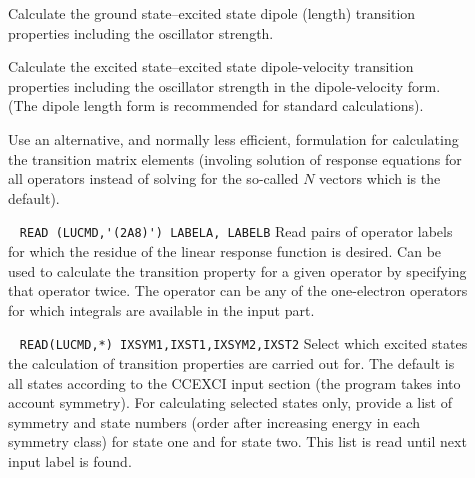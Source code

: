 \begin{description}

\item[]
%
Calculate the ground state--excited state dipole (length) transition properties including
the oscillator strength.
%
\item[]
%
Calculate the excited state--excited state dipole-velocity  transition properties including
the oscillator strength in the dipole-velocity form. (The dipole length form is recommended
for standard calculations).
%
\item[]
%
Use an alternative, and normally less efficient, formulation for calculating
the transition matrix elements (involing solution of response equations for
all operators instead of solving for the so-called $N$ vectors which is the default).
%
\item[]\verb| |  \newline
\verb|READ (LUCMD,'(2A8)') LABELA, LABELB|\newline
%
Read pairs of operator labels for which the residue of the linear response
function is desired.
Can be used to calculate the transition property for a given operator
by specifying that operator twice. The operator can be any of the one-electron
operators for which integrals are available in the  input part.
%
\item[] \verb| | \newline
\verb|READ(LUCMD,*) IXSYM1,IXST1,IXSYM2,IXST2|\newline 
%
Select which excited states the calculation of transition properties
are carried out for. The default is all states according to the CCEXCI input section
(the program takes into account symmetry). For calculating selected states only,
provide a list of symmetry and state numbers (order after increasing energy in
each symmetry class) for state one and for state two.
This list is read until next input label is found.

\end{description}

